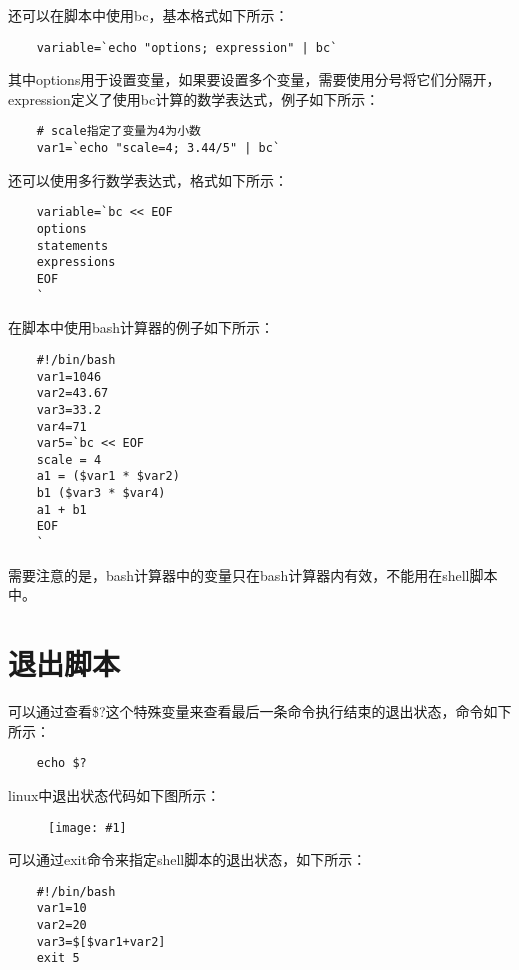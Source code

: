 \documentclass[a4paper,left=1.5cm,right=1.5cm,11pt]{article}
\newcommand{\fic}[1]{\begin{figure}[H]
		\center
		\texttt{[image: \#1]}
	\end{figure}}
\begin{document}
	还可以在脚本中使用bc，基本格式如下所示：
	\begin{lstlisting}
	variable=`echo "options; expression" | bc`
	\end{lstlisting}

	其中options用于设置变量，如果要设置多个变量，需要使用分号将它们分隔开，expression定义了使用bc计算的数学表达式，例子如下所示：
	\begin{lstlisting}
	# scale指定了变量为4为小数
	var1=`echo "scale=4; 3.44/5" | bc`
	\end{lstlisting}

	还可以使用多行数学表达式，格式如下所示：
	\begin{lstlisting}
	variable=`bc << EOF
	options
	statements
	expressions
	EOF
	`
	\end{lstlisting}

	在脚本中使用bash计算器的例子如下所示：
	\begin{lstlisting}
	#!/bin/bash
	var1=1046
	var2=43.67
	var3=33.2
	var4=71
	var5=`bc << EOF
	scale = 4
	a1 = ($var1 * $var2)
	b1 ($var3 * $var4)
	a1 + b1
	EOF
	`
	\end{lstlisting}

	需要注意的是，bash计算器中的变量只在bash计算器内有效，不能用在shell脚本中。

\section{退出脚本}
	可以通过查看\$?这个特殊变量来查看最后一条命令执行结束的退出状态，命令如下所示：
	\begin{lstlisting}
	echo $?
	\end{lstlisting}

	linux中退出状态代码如下图所示：
	\fic{5.png}

	可以通过exit命令来指定shell脚本的退出状态，如下所示：
	\begin{lstlisting}
	#!/bin/bash
	var1=10
	var2=20
	var3=$[$var1+var2]
	exit 5
	\end{lstlisting}
\end{document}
